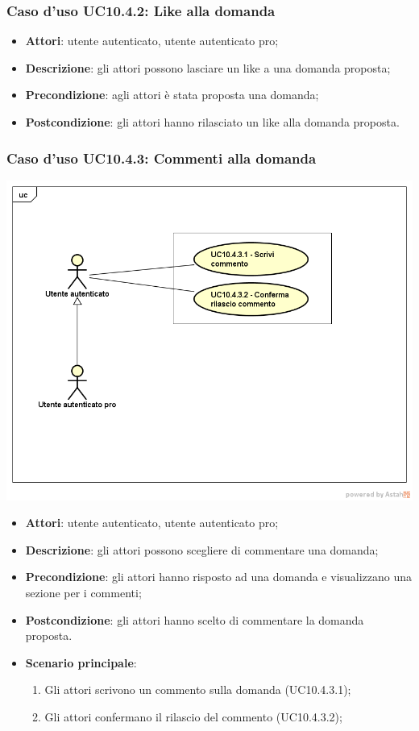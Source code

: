 \subsubsection{Caso d'uso UC10.4.2: Like alla domanda}
	\begin{itemize}
		\item \textbf{Attori}: utente autenticato, utente autenticato pro;
		\item \textbf{Descrizione}: gli attori possono lasciare un like a una domanda proposta;
		\item \textbf{Precondizione}: agli attori è stata proposta una domanda;
		\item \textbf{Postcondizione}: gli attori hanno rilasciato un like alla domanda proposta.
	\end{itemize}
\subsubsection{Caso d'uso UC10.4.3: Commenti alla domanda}
\label{UC10.4.3}
\begin{center}
	\centering
	\includegraphics[scale=0.5]{UML/UC10_4_3.png}
\end{center}
	\begin{itemize}
		\item \textbf{Attori}: utente autenticato, utente autenticato pro;
		\item \textbf{Descrizione}: gli attori possono scegliere di commentare una domanda;
		\item \textbf{Precondizione}: gli attori hanno risposto ad una domanda e visualizzano una sezione per i commenti;
		\item \textbf{Postcondizione}: gli attori hanno scelto di commentare la domanda proposta.
		\item \textbf{Scenario principale}:
			\begin{enumerate}
				\item Gli attori scrivono un commento sulla domanda (UC10.4.3.1);
				\item Gli attori confermano il rilascio del commento (UC10.4.3.2);
			\end{enumerate}
	\end{itemize}
